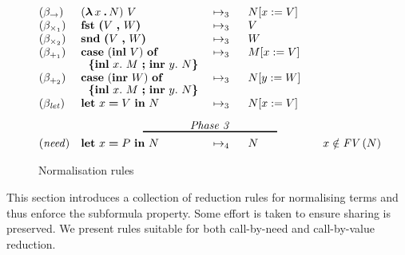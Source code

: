 {\begin{figure*}[t]
\[\begin{array}[t]{@{}llll@{\qquad}l@{}}



(\beta_{\rightarrow})
& \expapp{(\expabs{x}{A}{N})}{V}
& \ \rewrite{}{3}{}\ \
& \sbs{N}{x}{V}
& \\[0pt]

(\beta_{\times_1})
& \expfst{\expprd{V}{W}}
& \ \rewrite{}{3}{}\ \
& V
& \\[0pt]

(\beta_{\times_2})
& \expsnd{\expprd{V}{W}}
& \ \rewrite{}{3}{}\ \
& W
& \\[0pt]

(\beta_{+_1})
& \expcasind{(\explft{V}{B})}{x}{M}{y}{N}
& \ \rewrite{}{3}{}\ \
& \sbs{M}{x}{V}
& \\[0pt]

(\beta_{+_2})
& \expcasind{(\exprgt{A}{W})}{x}{M}{y}{N}
& \ \rewrite{}{3}{}\ \
& \sbs{N}{y}{W}
& \\[0pt]

(\beta_{\txt{let}})
& \expshr{x}{V}{N}
& \ \rewrite{}{3}{}\ \
& \sbs{N}{x}{V}
& \\[8pt]

\multicolumn{5}{@{}c@{}}{\txt{Phase 3}}\\[-9pt]
\multicolumn{5}{@{}c@{}}{\rule{120pt}{1pt}}\\[1pt]

(\txt{need})
& \expshr{x}{\nv}{N}
& \ \rewrite{}{4}{}\ \
& N %
& \cnd{%
       x \notin \fv{N}}\\[0pt]
\end{array}
\]
\caption{Normalisation rules}
\label{fig:norm}
\end{figure*}
}


\figterm
\fignf
\fignorm


This section introduces a collection of reduction rules for
normalising terms and thus enforce the subformula property. Some
effort is taken to ensure sharing is preserved. We present rules
suitable for both call-by-need and call-by-value reduction.

